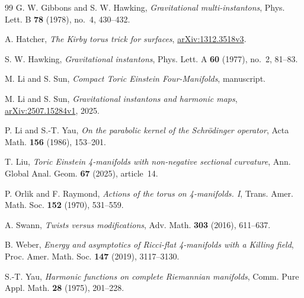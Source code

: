 \begin{thebibliography}{99}
G. W. Gibbons and S. W. Hawking, \emph{Gravitational multi-instantons},
Phys. Lett. B \textbf{78} (1978), no.~4, 430--432.

A. Hatcher, \emph{The Kirby torus trick for surfaces},
\href{https://arxiv.org/abs/1312.3518v3}{arXiv:1312.3518v3}.

S. W. Hawking, \emph{Gravitational instantons},
Phys. Lett. A \textbf{60} (1977), no.~2, 81--83.

M. Li and S. Sun, \emph{Compact Toric Einstein Four-Manifolds},
manuscript.

M. Li and S. Sun, \emph{Gravitational instantons and harmonic maps},
\href{https://arxiv.org/abs/2507.15284v1}{arXiv:2507.15284v1}, 2025.

P. Li and S.-T. Yau, \emph{On the parabolic kernel of the Schr\"odinger operator},
Acta Math. \textbf{156} (1986), 153--201.

T. Liu, \emph{Toric Einstein 4-manifolds with non-negative sectional curvature},
Ann. Global Anal. Geom. \textbf{67} (2025), article~14.

P. Orlik and F. Raymond, \emph{Actions of the torus on 4-manifolds. I},
Trans. Amer. Math. Soc. \textbf{152} (1970), 531--559.

A. Swann, \emph{Twists versus modifications},
Adv. Math. \textbf{303} (2016), 611--637.

B. Weber, \emph{Energy and asymptotics of Ricci-flat 4-manifolds with a Killing field},
Proc. Amer. Math. Soc. \textbf{147} (2019), 3117--3130.

S.-T. Yau, \emph{Harmonic functions on complete Riemannian manifolds},
Comm. Pure Appl. Math. \textbf{28} (1975), 201--228.

\end{thebibliography}

